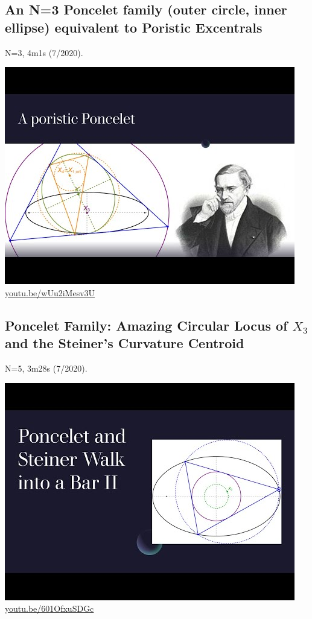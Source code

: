 \documentclass[12pt]{amsart}
\begin{document}
\subsection{An N=3 Poncelet family (outer circle, inner ellipse) equivalent to Poristic Excentrals}
\label{vid:wUu2iMesv3U}
\noindent N=3, 4m1s (7/2020). 
\begin{center}\includegraphics[width=.5\textwidth]{pics/wUu2iMesv3U.jpg} \\ 
\href{https://youtu.be/wUu2iMesv3U}{\url{youtu.be/wUu2iMesv3U}}\end{center}
% 

\subsection{Poncelet Family: Amazing Circular Locus of $X_{3}$ and the Steiner's Curvature Centroid}
\label{vid:601OfxuSDGc}
\noindent N=5, 3m28s (7/2020). 
\begin{center}\includegraphics[width=.5\textwidth]{pics/601OfxuSDGc.jpg} \\ 
\href{https://youtu.be/601OfxuSDGc}{\url{youtu.be/601OfxuSDGc}}\end{center}
% 
\end{document}
